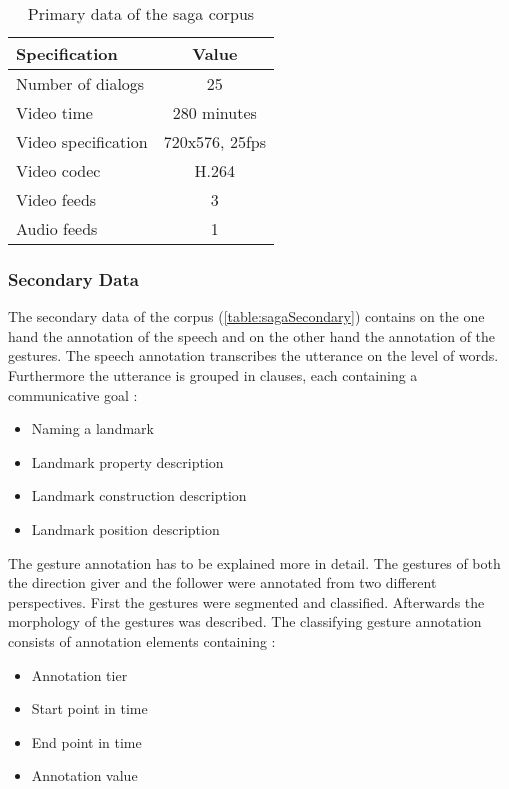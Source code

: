 \documentclass[a4paper]{article}
\begin{document}
				\begin{table}
					\center
					\begin{tabular}{|l|c|}
						\hline 
						\textbf{Specification} & \textbf{Value} \\ 
						\hline 
						Number of dialogs & 25 \\ 
						\hline 
						Video time & 280 minutes \\ 
						\hline 
						Video specification & 720x576, 25fps  \\ 
						\hline 
						Video codec & H.264  \\ 
						\hline 
						Video feeds & 3 \\ 
						\hline 
						Audio feeds & 1 \\ 
						\hline
					\end{tabular} 
					\caption{Primary data of the \gls{saga} corpus \cite{Bielefeld2010, BAS2014}}
					\label{table:sagaPrimary}
				\end{table}
				
			\subsubsection{Secondary Data}
				The secondary data of the corpus (\ref{table:sagaSecondary}) contains on the one hand the annotation of the speech and on the other hand the annotation of the gestures. The speech annotation transcribes the utterance on the level of words. Furthermore the utterance is grouped in clauses, each containing a communicative goal \cite[ch. 2]{Bielefeld2010}:
				\begin{itemize}
					\item Naming a landmark
					\item Landmark property description
					\item Landmark construction description
					\item Landmark position description
				\end{itemize}
				
				The gesture annotation has to be explained more in detail. The gestures of both the direction giver and the follower were annotated from two different perspectives. First the gestures were segmented and classified. Afterwards the morphology of the gestures was described. The classifying gesture annotation consists of annotation elements containing \cite[ch. 1.3]{Bergmann2014}:
				
				\begin{itemize}
					\item Annotation tier
					\item Start point in time
					\item End point in time
					\item Annotation value
				\end{itemize}								
				
\end{document}
